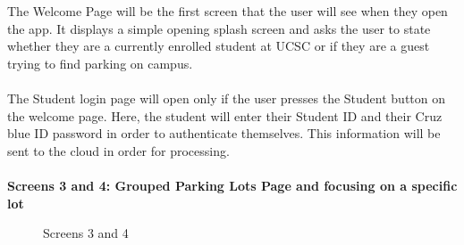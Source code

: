 \documentclass[paper=a4, fontsize=12pt]{scrartcl}
\numberwithin{equation}{section}		%
\numberwithin{figure}{section}			%
\numberwithin{table}{section}				%
\begin{document}
The Welcome Page will be the first screen that the user will see when they open the app. It displays a simple opening splash screen and asks the user to state whether they are a currently enrolled student at UCSC or if they are a guest trying to find parking on campus.
\\\\
The Student login page will open only if the user presses the Student button on the welcome page. Here, the student will enter their Student ID and their Cruz blue ID password in order to authenticate themselves. This information will be sent to the cloud in order for processing.
\\\\
\textbf{Screens 3 and 4: Grouped Parking Lots Page and focusing on a specific lot}
\begin{figure}[H]
    \centering
    \qquad
    \caption{Screens 3 and 4}
\end{figure}
\\\\
\end{document}
